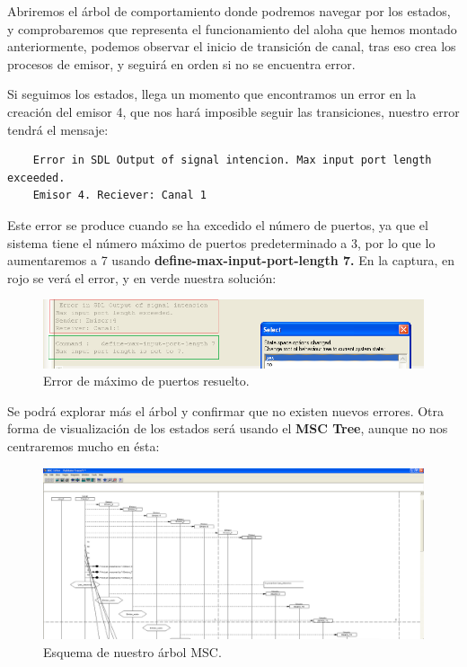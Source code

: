\documentclass{article}
\begin{document}
Abriremos el árbol de comportamiento donde podremos navegar por los estados, y comprobaremos que representa el funcionamiento del aloha que hemos montado anteriormente, podemos observar el inicio de transición de canal, tras eso crea los procesos de emisor, y seguirá en orden si no se encuentra error. 

Si seguimos los estados, llega un momento que encontramos un error en la creación del emisor 4, que nos hará imposible seguir las transiciones, nuestro error tendrá el mensaje:

\quad

\begin{center} 
    \begin{verbatim}
    Error in SDL Output of signal intencion. Max input port length exceeded.
    Emisor 4. Reciever: Canal 1
    \end{verbatim}
    \end{center} 
\quad

Este error se produce cuando se ha excedido el número de puertos, ya que el sistema tiene el número máximo de puertos predeterminado a 3, por lo que lo aumentaremos a 7 usando \textbf{define-max-input-port-length 7.} En la captura, en rojo se verá el error, y en verde nuestra solución:

\quad

\begin{figure}[h]
    \centering
    \includegraphics[width=0.95\linewidth]{src/error resuelto.png}
    \caption{\label{fig:errorresuelto} Error de máximo de puertos resuelto.}
\end{figure}

Se podrá explorar más el árbol y confirmar que no existen nuevos errores. Otra forma de visualización de los estados será usando el \textbf{MSC Tree}, aunque no nos centraremos mucho en ésta:

\quad 

\begin{figure}[h]
    \centering
    \includegraphics[width=0.65\linewidth]{src/MSC tree.png}
    \caption{\label{fig:msctree} Esquema de nuestro árbol MSC.}
\end{figure}
\end{document}
